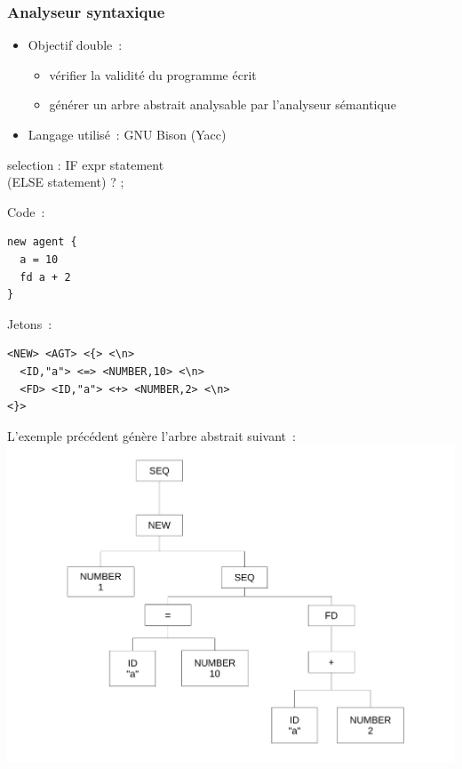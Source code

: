 \begin{frame}
	\frametitle{Analyseur syntaxique}
	\begin{itemize}
	\item Objectif double~: 
		\begin{itemize}
		\item vérifier la validité du programme écrit
		\item générer un arbre abstrait analysable par l'analyseur sémantique
		\end{itemize}
	\item Langage utilisé~: GNU Bison (Yacc)
	\end{itemize}
\end{frame}

\begin{frame}[fragile]
	\begin{rail}
		selection : IF expr statement \\ (ELSE statement) ? ;
	\end{rail}
\end{frame}

\begin{frame}[fragile]
	Code~:
	\begin{lstlisting}[language=Stibbons]
new agent {
  a = 10
  fd a + 2
}
	\end{lstlisting}
	Jetons~:
	\begin{lstlisting}[breaklines]
<NEW> <AGT> <{> <\n> 
  <ID,"a"> <=> <NUMBER,10> <\n>
  <FD> <ID,"a"> <+> <NUMBER,2> <\n>
<}>
	\end{lstlisting}
\end{frame}

\begin{frame}
L'exemple précédent génère l'arbre abstrait suivant~:
\includegraphics[scale=0.3]{doc/Presentation/img/arbre.pdf}
\end{frame}
